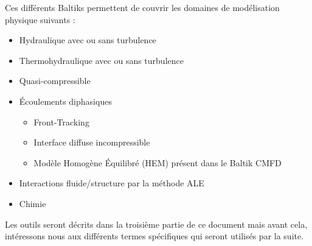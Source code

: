 Ces différents Baltiks permettent de couvrir les domaines de modélisation physique suivants :
\begin{itemize}[label=$\Rightarrow$, font=\LARGE]
  \item Hydraulique avec ou sans turbulence
  \item Thermohydraulique avec ou sans turbulence
  \item Quasi-compressible
  \item Écoulements diphasiques
  \begin{itemize}
    \item Front-Tracking
    \item Interface diffuse incompressible
    \item Modèle Homogène Équilibré (HEM) pr\'esent dans le Baltik CMFD
  \end{itemize}
  \item Interactions fluide/structure par la méthode ALE
  \item Chimie
\end{itemize}

Les outils seront décrits dans la troisième partie de ce document mais avant cela, intéressons nous aux différents termes spécifiques qui seront utilisés par la suite.
